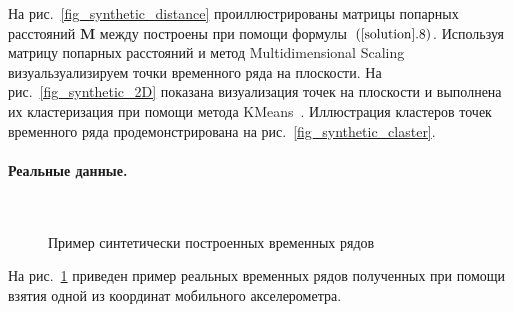 \documentclass[12pt, twoside]{article}
\begin{document}
На рис.~\ref{fig_synthetic_distance} проиллюстрированы матрицы попарных расстояний $\textbf{M}$ между построены при помощи формулы~$(\ref{solution}.8)$. Используя матрицу попарных расстояний и метод Multidimensional Scaling~\cite{Borg2005} визуальзуализируем точки временного ряда на плоскости. На рис.~\ref{fig_synthetic_2D} показана визуализация точек на плоскости и выполнена их кластеризация при помощи метода KMeans~\cite{Kanungo2000}. Иллюстрация кластеров точек временного ряда продемонстрирована на рис.~\ref{fig_synthetic_claster}.

\paragraph{Реальные данные.}
\begin{figure}[h!t]\center
{}
\\
\caption{Пример синтетически построенных временных рядов}
\label{fig_real_series}
\end{figure}

На рис.~\ref{fig_real_series} приведен пример реальных временных рядов полученных при помощи взятия одной из координат мобильного акселерометра. 
\end{document}
